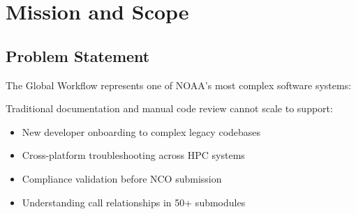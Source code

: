 \documentclass[11pt,letterpaper,twoside]{article}
\begin{document}
\vspace{1em}
\tableofcontents
\newpage

\section{Mission and Scope}

\subsection{Problem Statement}

The Global Workflow represents one of NOAA's most complex software systems:

\begin{center}
\end{center}

\vspace{0.5em}
Traditional documentation and manual code review cannot scale to support:
\begin{itemize}[leftmargin=2em]
    \item New developer onboarding to complex legacy codebases
    \item Cross-platform troubleshooting across HPC systems
    \item Compliance validation before NCO submission
    \item Understanding call relationships in 50+ submodules
\end{itemize}
\end{document}
